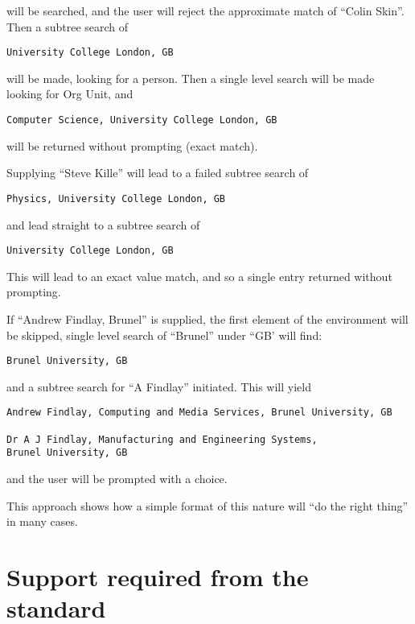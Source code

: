 will be searched, and the user will reject the approximate match of ``Colin
Skin''.   Then a subtree search of

\begin{verbatim}
University College London, GB
\end{verbatim}

will be made, looking for a person.  Then a single level search will be made
looking for Org Unit, and 

\begin{verbatim}
Computer Science, University College London, GB
\end{verbatim}

will be returned without prompting (exact match).   


Supplying ``Steve Kille'' will lead to a failed subtree search of 

\begin{verbatim}
Physics, University College London, GB
\end{verbatim}

and lead straight to a subtree search of

\begin{verbatim}
University College London, GB
\end{verbatim}

This will lead to an exact value match, and so a single entry returned
without prompting.


If ``Andrew Findlay, Brunel'' is supplied, the first element of the
environment will be skipped, single level search of ``Brunel'' under ``GB'
will find:

\begin{verbatim}
Brunel University, GB
\end{verbatim}

and a subtree search for ``A Findlay'' initiated.   This will yield

\begin{verbatim}
Andrew Findlay, Computing and Media Services, Brunel University, GB

Dr A J Findlay, Manufacturing and Engineering Systems, 
Brunel University, GB
\end{verbatim}


and the user will be prompted with a choice.


This approach shows how a simple format of this nature will ``do the right
thing'' in many cases.   

\section {Support required from the standard}

